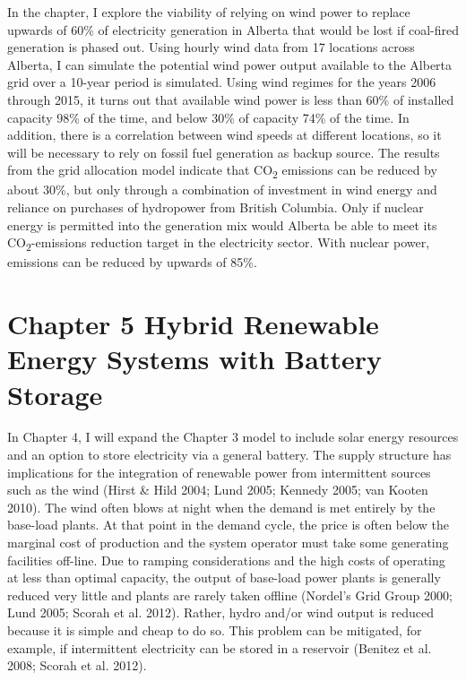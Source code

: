 In the chapter, I explore the viability of relying on wind power to
replace upwards of 60\% of electricity generation in Alberta that would
be lost if coal-fired generation is phased out. Using hourly wind data
from 17 locations across Alberta, I can simulate the potential wind
power output available to the Alberta grid over a 10-year period is
simulated. Using wind regimes for the years 2006 through 2015, it turns
out that available wind power is less than 60\% of installed capacity
98\% of the time, and below 30\% of capacity 74\% of the time. In
addition, there is a correlation between wind speeds at different
locations, so it will be necessary to rely on fossil fuel generation as
backup source. The results from the grid allocation model indicate that
CO\textsubscript{2} emissions can be reduced by about 30\%, but only
through a combination of investment in wind energy and reliance on
purchases of hydropower from British Columbia. Only if nuclear energy is
permitted into the generation mix would Alberta be able to meet its
CO\textsubscript{2}-emissions reduction target in the electricity
sector. With nuclear power, emissions can be reduced by upwards of 85\%.

\section{Chapter 5 Hybrid Renewable Energy Systems with Battery
	Storage
}\label{chapter-5-hybrid-renewable-energy-systems-with-battery-storage}

In Chapter 4, I will expand the Chapter 3 model to include solar energy
resources and an option to store electricity via a general battery. The
supply structure has implications for the integration of renewable power
from intermittent sources such as the wind (Hirst \& Hild 2004; Lund
2005; Kennedy 2005; van Kooten 2010). The wind often blows at night when
the demand is met entirely by the base-load plants. At that point in the
demand cycle, the price is often below the marginal cost of production
and the system operator must take some generating facilities off-line.
Due to ramping considerations and the high costs of operating at less
than optimal capacity, the output of base-load power plants is generally
reduced very little and plants are rarely taken offline (Nordel's Grid
Group 2000; Lund 2005; Scorah et al. 2012). Rather, hydro and/or wind
output is reduced because it is simple and cheap to do so. This problem
can be mitigated, for example, if intermittent electricity can be stored
in a reservoir (Benitez et al. 2008; Scorah et al. 2012).

